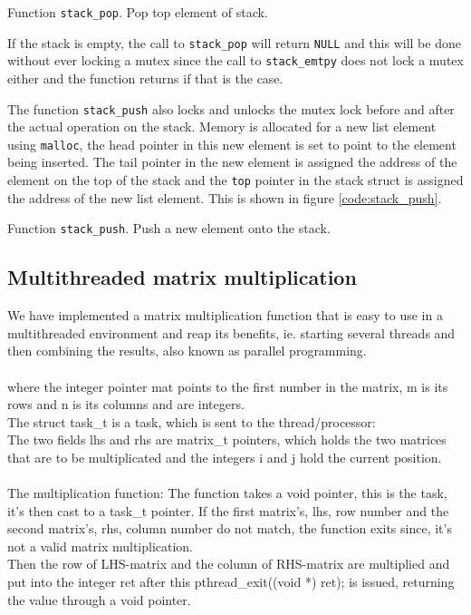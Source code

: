 {Function \texttt{stack\_pop}. Pop top element of stack.}

If the stack is empty, the call to \verb|stack_pop| will return \verb|NULL| and
this will be done without ever locking a mutex since the call to
\verb|stack_emtpy| does not lock a mutex either and the function returns if that
is the case.

The function \verb|stack_push| also locks and unlocks the mutex lock before and
after the actual operation on the stack. Memory is allocated for a new list
element using \verb|malloc|, the head pointer in this new element is set to
point to the element being inserted. The tail pointer in the new element is
assigned the address of the element on the top of the stack and the \verb|top|
pointer in the stack struct is assigned the address of the new list element.
This is shown in figure \ref{code:stack_push}.

{Function \texttt{stack\_push}. Push a new element onto the stack.}


\subsection{Multithreaded matrix multiplication}
We have implemented a matrix multiplication function that is easy to use in a
multithreaded environment and reap its benefits, ie. starting several threads
and then combining the results, also known as parallel programming.\\
\\
where the integer pointer \textsf{mat} points to the first number in the matrix,
\textsf{m} is its rows and \textsf{n} is its columns and are integers.\\
The \textsf{struct task\_t} is a task, which is sent to the thread/processor:\\
The two fields \textsf{lhs} and \textsf{rhs} are matrix\_t pointers, which holds the two
matrices that are to be multiplicated and the integers \textsf{i} and \textsf{j} hold
the current position.\\
\\
The multiplication function:
The function takes a void pointer, this is the task, it's then cast to a task\_t
pointer. If the first matrix's, lhs, row number and the second matrix's, rhs,
column number do not match, the function exits since, it's not a valid matrix
multiplication.\\
Then the row of LHS-matrix and the column of RHS-matrix are multiplied and
put into the integer \textsf{ret} after this \textsf{pthread\_exit((void *)
ret);} is issued, returning the value through a void pointer.\\

